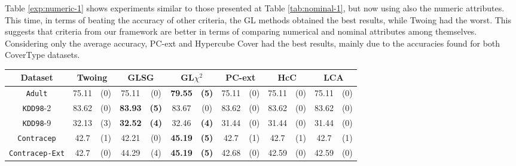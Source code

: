 Table \ref{exp:numeric-1} shows experiments  similar to those presented at Table \ref{tab:nominal-1}, but now
using also the numeric attributes. This time, in terms of beating the accuracy of other criteria, the GL methods obtained the best results, while Twoing had the worst. This suggests that criteria from our framework are better in terms of comparing numerical and nominal attributes among themselves. Considering only the average accuracy, PC-ext and Hypercube Cover had the best results, mainly due to the accuracies found for both CoverType datasets.

\begin{table}
\scriptsize
\centering
\begin{tabular}{c|cc|cc|cc|cc|cc|cc} 
Dataset            &\multicolumn{2}{c|}{Twoing} & \multicolumn{2}{c|}{GLSG} & \multicolumn{2}{c|}{GL$\chi^2$} & \multicolumn{2}{c|}{PC-ext}& \multicolumn{2}{c|}{HcC}& \multicolumn{2}{c}{LCA}\\
\hline   
{\tt Adult}        & 75.11          &  (0)      & 75.11      & (0)          & {\bf 79.55} &  {\bf (5)}        & 75.11       &  (0)         & 75.11       &  (0)     & 75.11       & (0)       \\
{\tt KDD98}-2      & 83.62          &  (0)      & {\bf 83.93}& {\bf (5)}    & 83.67       &  (0)              & 83.62       &  (0)         & 83.62       &  (0)     & 83.62       & (0)       \\ 
{\tt KDD98}-9      & 32.13          &  (3)      &{\bf 32.52} & {\bf (4)}    & 32.46       &  {\bf (4)}        & 31.44       &  (0)         & 31.44       &  (0)     & 31.44       & (0)       \\ 
{\tt Contracep}    & 42.7           &  (1)      & 42.21      & (0)          & {\bf 45.19} &  {\bf (5)}        & 42.7        &  (1)         & 42.7        &  (1)     & 42.7        & (1)       \\  
{\tt Contracep-Ext}& 42.7           &  (0)      & 44.29      & (4)          & {\bf 45.19} &  {\bf (5)}        & 42.68       &  (0)         & 42.59       &  (0)     & 42.59       & (0)       \\ 

\end{tabular}
\end{table}
